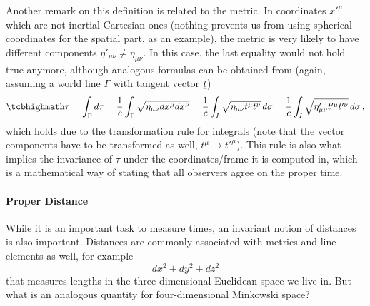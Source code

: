 \documentclass[../relativity_main.tex]{subfiles}
\begin{document}
Another remark on this definition is related to the metric. In coordinates $x'^\mu$ which are not inertial Cartesian ones (nothing prevents us from using spherical coordinates for the spatial part, as an example), the metric is very likely to have different components $\eta'_{\mu \nu} \neq \eta_{\mu \nu}$. In this case, the last equality would not hold true anymore, although analogous formulas can be obtained from (again, assuming a world line $\Gamma$ with tangent vector $\underline{t}$)
\begin{equation}\label{eq:proper_time_non_cartesian}
	\eqbox{
	\tau = \int_\Gamma d\tau = \frac{1}{c} \int_\Gamma \sqrt{\eta_{\mu \nu} dx^\mu dx^\nu} = \frac{1}{c} \int_I \sqrt{\eta_{\mu \nu} t^\mu t^\nu} \, d\sigma = \frac{1}{c} \int_I \sqrt{\eta'_{\mu \nu} t'^\mu t'^\nu} \, d\sigma
	} \, ,
\end{equation}
which holds due to the transformation rule for integrals (note that the vector components have to be transformed as well, $t^\mu \rightarrow t'^\mu$). This rule is also what implies the invariance of $\tau$ under the coordinates/frame it is computed in, which is a mathematical way of stating that all observers agree on the proper time.




			\paragraph{Proper Distance}
While it is an important task to measure times, an invariant notion of distances is also important. Distances are commonly associated with metrics and line elements as well, for example
\begin{equation*}
	dx^2 + dy^2 + dz^2
\end{equation*}
that measures lengths in the three-dimensional Euclidean space we live in. But what is an analogous quantity for four-dimensional Minkowski space?\\
\end{document}
